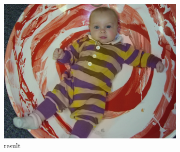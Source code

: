 \documentclass{article}
\begin{document}
\begin{figure}[H]
{\begin{minipage}[t]{0.3\linewidth}
\includegraphics[width=\linewidth]{result_21.png}
\caption{result}
\end{minipage}
}%
\centering
\end{figure}
\end{document}
